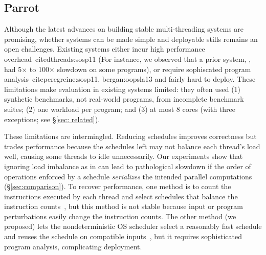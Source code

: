 \subsection{Parrot} \label{sec:parrot}

Although the latest advances on building stable
multi-threading systems are promising, whether \smt systems can be 
made simple and deployable stills remains an open challenges. Existing systems 
either incur high performance overhead~cite{dthreads:sosp11} (For instance, 
we observed
that a prior system, \dthreads, had 5$\times$ to 100$\times$ slowdown on
some programs), or require sophiscated
program analysis~cite{peregreine:sosp11, bergan:oopsla13} and fairly hard to 
deploy.
These limitations make evaluation in existing systems limited: they often 
used (1) synthetic benchmarks,
not real-world programs, from incomplete benchmark suites; (2) one workload
per program; and (3) at most 8 cores (with three exceptions; see \S\ref{sec:
related}).

These limitations are intermingled.  Reducing schedules improves correctness
but trades performance because the schedules left may not balance each
thread's load well, causing some threads to idle unnecessarily.  Our
experiments show that ignoring load imbalance as in \dthreads
can lead to pathological
slowdown if the order of operations enforced by a schedule
\emph{serializes} the intended parallel computations
(\S\ref{sec:comparison}).  To recover performance, one method is to count
the instructions executed by each thread and select schedules that balance
the instruction counts~\cite{kendo:asplos09, coredet:asplos10,
  dmp:asplos09}, but this method is not stable because input or program
perturbations easily change the instruction counts.  The other method (we 
proposed)
lets the nondeterministic OS scheduler select
a reasonably fast schedule and reuses the schedule on
compatible inputs~\cite{cui:tern:osdi10,peregrine:sosp11}, but it
requires sophisticated program analysis, complicating deployment.



